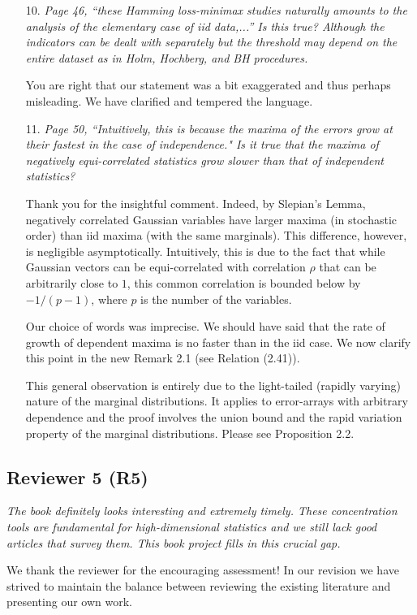 \documentclass[11pt]{article}
\begin{document}
\medskip
{}
\begin{itemize}
 \item [10.] {\em Page 46, ``these Hamming loss-minimax studies naturally amounts to the analysis of the elementary case of iid data,...'' 
 Is this true? Although the indicators can be dealt with separately but the threshold may depend on the entire dataset as in Holm, 
 Hochberg, and BH procedures. }
 
 You are right that our statement was a bit exaggerated and thus perhaps misleading. We have clarified and tempered the language.
 
 \item[11.]{\em Page 50, ``Intuitively, this is because the maxima of the errors grow at their fastest in the case of independence." Is it true that the maxima of negatively equi-correlated statistics grow slower than that of independent statistics?}
 
  Thank you for the insightful comment.  Indeed, by Slepian's Lemma, negatively correlated Gaussian variables have larger maxima (in stochastic order)
  than iid maxima (with the same marginals).  This difference, however, is negligible asymptotically.  Intuitively, this is due to the fact that while Gaussian
  vectors can be equi-correlated with correlation $\rho$ that can be arbitrarily close to $1$, this common correlation is bounded below by $-1/(p-1)$,
  where $p$ is the number of the variables. 
  
  Our choice of words was imprecise. We should have said that the rate of growth of dependent maxima is no faster than in the iid case.  
  We now clarify this point in the new Remark 2.1 (see Relation (2.41)). 
  
  This general observation is entirely due to the light-tailed (rapidly varying) nature of the marginal distributions.  It applies to error-arrays with arbitrary
  dependence and the proof involves the union bound and the rapid variation property of the marginal distributions.  Please see Proposition 2.2.
   
 
\end{itemize}

   \subsection{Reviewer 5 (R5)}
   
  {\em The book definitely looks interesting and extremely timely. These concentration tools are fundamental for high-dimensional statistics 
  and we still lack good articles that survey them. This book project fills in this crucial gap.}
  
  
  \bigskip
\noindent   We thank the reviewer for the encouraging assessment!  In our revision we have strived to maintain the balance between reviewing the
   existing literature and presenting our own work.  
   
   
   
\end{document}
